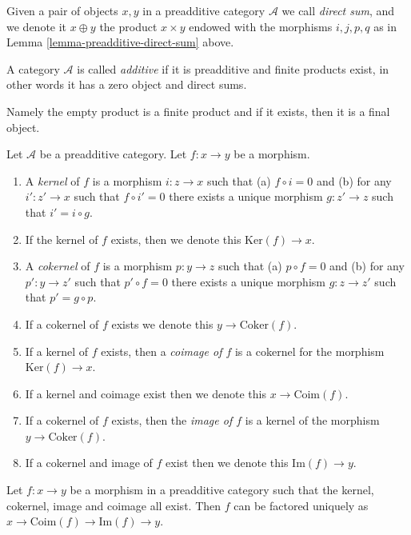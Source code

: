 \begin{definition}
\label{definition-direct-sum}
Given a pair of objects $x, y$
in a preadditive category $\mathcal{A}$ we call
{\it direct sum}, and we denote it $x \oplus y$ the
product $x \times y$ endowed with the morphisms
$i,j,p,q$ as in Lemma \ref{lemma-preadditive-direct-sum} above.
\end{definition}

\begin{definition}
\label{definition-additive-category}
A category $\mathcal{A}$ is called {\it additive}
if it is preadditive and finite products exist, in other
words it has a zero object and direct sums.
\end{definition}

\noindent
Namely the empty product is a finite product and
if it exists, then it is a final object.

\begin{definition}
\label{definition-kernel}
Let $\mathcal{A}$ be a preadditive category.
Let $f : x \to y$ be a morphism.
\begin{enumerate}
\item A {\it kernel} of $f$ is a morphism
$i : z \to x$ such that (a) $f \circ i = 0$ and (b)
for any $i' : z' \to x$ such that $f \circ i' = 0$ there
exists a unique morphism $g : z' \to z$ such that
$i' = i \circ g$.
\item If the kernel of $f$ exists, then we denote
this $\text{Ker}(f) \to x$.
\item A {\it cokernel} of $f$ is a morphism
$p : y \to z$ such that (a) $p \circ f = 0$ and (b)
for any $p' : y \to z'$ such that $p' \circ f = 0$ there
exists a unique morphism $g : z \to z'$ such that
$p' = g \circ p$.
\item If a cokernel of $f$ exists we denote this
$y \to \text{Coker}(f)$.
\item If a kernel of $f$ exists, then a {\it coimage
of $f$} is a cokernel for the morphism $\text{Ker}(f) \to x$.
\item If a kernel and coimage exist then we denote this
$x \to \text{Coim}(f)$.
\item If a cokernel of $f$ exists, then the {\it image of
$f$} is a kernel of the morphism $y \to \text{Coker}(f)$.
\item If a cokernel and image of $f$ exist then we denote
this $\text{Im}(f) \to y$.
\end{enumerate}
\end{definition}

\begin{lemma}
\label{lemma-coim-im-map}
Let $f : x \to y$ be a morphism in a preadditive category
such that the kernel, cokernel, image and coimage all exist.
Then $f$ can be factored uniquely as
$x \to \text{Coim}(f) \to \text{Im}(f) \to y$.
\end{lemma}

